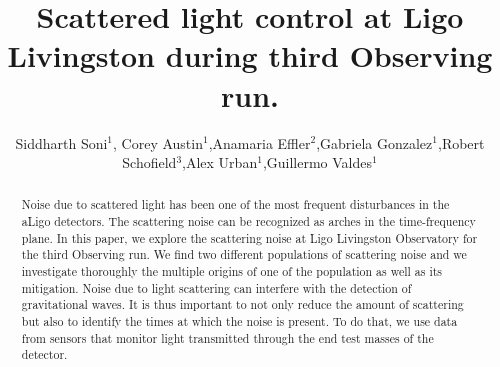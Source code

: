 \documentclass[12pt]{iopart}
\begin{document}



\title{Scattered light control at Ligo Livingston during third Observing run.}





\author{Siddharth Soni$^1$, Corey Austin$^1$,Anamaria Effler$^2$,Gabriela Gonzalez$^1$,Robert Schofield$^3$,Alex Urban$^1$,Guillermo Valdes$^1$}\address{$^1$ Department of Physics and Astronomy, Louisiana State University,Baton Rouge, LA, 70803,USA}\address{$^2$ LIGO Livingston Observatory, Livingston, LA 70754, USA}\address{$^3$ Department of Physics, University of Oregon, Eugene, OR 97403, USA}
\begin{abstract}

Noise due to scattered light has been one of the most frequent disturbances in the aLigo detectors. The scattering noise can be recognized as arches in the time-frequency plane. In this paper, we explore the scattering noise at Ligo Livingston Observatory for the third Observing run. We find two different populations of scattering noise and we investigate thoroughly the multiple origins of one of the population as well as its mitigation. Noise due to light scattering can interfere with the detection of gravitational waves. It is thus important to not only reduce the amount of scattering but also to identify the times at which the noise is present. To do that, we use data from sensors that monitor light transmitted through the end test masses of the detector.


\end{abstract}
\end{document}
